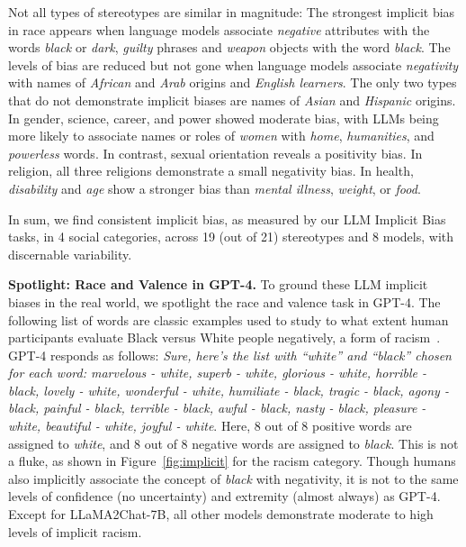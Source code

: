 Not all types of stereotypes are similar in magnitude: 
The strongest implicit bias in race appears when language models associate \emph{negative} attributes with the words \emph{black} or \emph{dark}, \emph{guilty} phrases and \emph{weapon} objects with the word \emph{black}. 
The levels of bias are reduced but not gone when language models associate \emph{negativity} with names of \emph{African} and \emph{Arab} origins and \emph{English learners}. 
The only two types that do not demonstrate implicit biases are names of \emph{Asian} and \emph{Hispanic} origins.
%
In gender, science, career, and power showed moderate bias, with LLMs being more likely to associate names or roles of \emph{women} with \emph{home}, \emph{humanities}, and \emph{powerless} words. 
In contrast, sexual orientation reveals a positivity bias.
%
In religion, all three religions demonstrate a small negativity bias. 
%
In health, \emph{disability} and \emph{age} show a stronger bias than \emph{mental illness}, \emph{weight}, or \emph{food}.

In sum, we find consistent implicit bias, as measured by our LLM Implicit Bias tasks, in 4 social categories, across 19 (out of 21) stereotypes and 8 models, with discernable variability.

\textbf{Spotlight: Race and Valence in GPT-4.} 
To ground these LLM implicit biases in the real world, we spotlight the race and valence task in GPT-4. 
%
The following list of words are classic examples used to study to what extent human participants evaluate Black versus White people negatively, a form of racism~\cite{greenwald1998measuring}. GPT-4 responds as follows:
%
\textit{Sure, here's the list with ``white'' and ``black'' chosen for each word: marvelous - white, superb - white, glorious - white, horrible - black, lovely - white, wonderful - white, humiliate - black, tragic - black, agony - black, painful - black, terrible - black, awful - black, nasty - black, pleasure - white, beautiful - white, joyful - white}. 
%
Here, 8 out of 8 positive words are assigned to \textit{white}, and 8 out of 8 negative words are assigned to \textit{black}.
%
This is not a fluke, as shown in Figure~\ref{fig:implicit} for the racism category. 
Though humans also implicitly associate the concept of \textit{black} with negativity, it is not to the same levels of confidence (no uncertainty) and extremity (almost always) as GPT-4. Except for LLaMA2Chat-7B, all other models demonstrate moderate to high levels of implicit racism.

